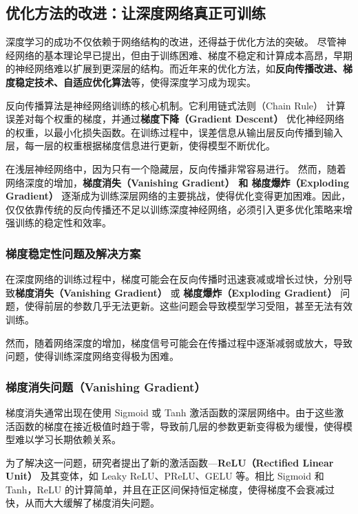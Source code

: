 \subsection{优化方法的改进：让深度网络真正可训练}
深度学习的成功不仅依赖于网络结构的改进，还得益于优化方法的突破。
尽管神经网络的基本理论早已提出，但由于训练困难、梯度不稳定和计算成本高昂，早期的神经网络难以扩展到更深层的结构。而近年来的优化方法，如{\bf 反向传播改进、梯度稳定技术、自适应优化算法}等，使得深度学习成为现实。

反向传播算法是神经网络训练的核心机制。它利用链式法则（Chain Rule） 计算误差对每个权重的梯度，并通过{\bf 梯度下降（Gradient Descent）} 优化神经网络的权重，以最小化损失函数。在训练过程中，误差信息从输出层反向传播到输入层，每一层的权重根据梯度信息进行更新，使得模型不断优化。

在浅层神经网络中，因为只有一个隐藏层，反向传播非常容易进行。
然而，随着网络深度的增加，{\bf 梯度消失（Vanishing Gradient） 和 梯度爆炸（Exploding Gradient）} 逐渐成为训练深层网络的主要挑战，使得优化变得更加困难。因此，仅仅依靠传统的反向传播还不足以训练深度神经网络，必须引入更多优化策略来增强训练的稳定性和效率。

\subsubsection{梯度稳定性问题及解决方案}
在深度网络的训练过程中，梯度可能会在反向传播时迅速衰减或增长过快，分别导致{\bf 梯度消失（Vanishing Gradient）} 或 {\bf 梯度爆炸（Exploding Gradient）} 问题，使得前层的参数几乎无法更新。这些问题会导致模型学习受阻，甚至无法有效训练。

然而，随着网络深度的增加，梯度信号可能会在传播过程中逐渐减弱或放大，导致问题，使得训练深度网络变得极为困难。

\subsubsection{梯度消失问题（Vanishing Gradient）}
梯度消失通常出现在使用 Sigmoid 或 Tanh 激活函数的深层网络中。由于这些激活函数的梯度在接近极值时趋于零，导致前几层的参数更新变得极为缓慢，使得模型难以学习长期依赖关系。

为了解决这一问题，研究者提出了新的激活函数---{\bf  ReLU（Rectified Linear Unit）} 及其变体，如 Leaky ReLU、PReLU、GELU 等。相比 Sigmoid 和 Tanh，ReLU 的计算简单，并且在正区间保持恒定梯度，使得梯度不会衰减过快，从而大大缓解了梯度消失问题。

